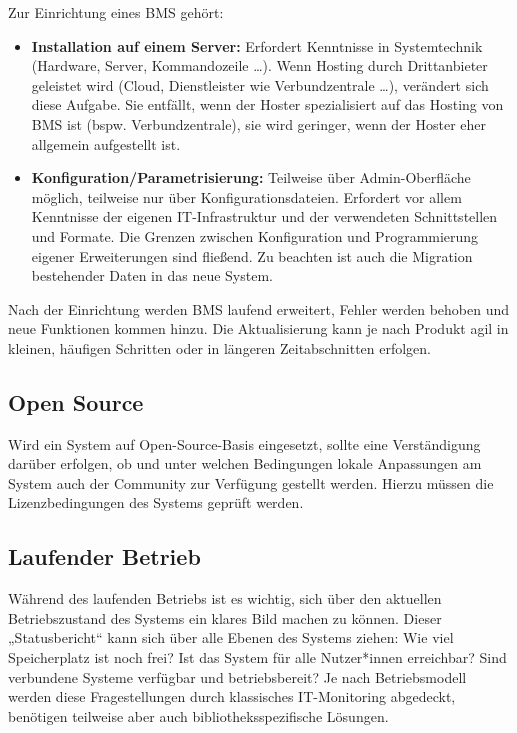 \documentclass[
  11pt,
  letterpaper,
  DIV=11,
  twoside]{scrreprt}
\begin{document}
Zur Einrichtung eines BMS gehört:

\begin{itemize}
\item
  \textbf{Installation auf einem Server:} Erfordert Kenntnisse in
  Systemtechnik (Hardware, Server, Kommandozeile \ldots). Wenn Hosting
  durch Drittanbieter geleistet wird (Cloud, Dienstleister wie
  Verbundzentrale \ldots), verändert sich diese Aufgabe. Sie entfällt,
  wenn der Hoster spezialisiert auf das Hosting von BMS ist (bspw.
  Verbundzentrale), sie wird geringer, wenn der Hoster eher allgemein
  aufgestellt ist.
\item
  \textbf{Konfiguration/Parametrisierung:} Teilweise über
  Admin-Oberfläche möglich, teilweise nur über Konfigurationsdateien.
  Erfordert vor allem Kenntnisse der eigenen IT-Infrastruktur und der
  verwendeten Schnittstellen und Formate. Die Grenzen zwischen
  Konfiguration und Programmierung eigener Erweiterungen sind fließend.
  Zu beachten ist auch die Migration bestehender Daten in das neue
  System.
\end{itemize}

Nach der Einrichtung werden BMS laufend erweitert, Fehler werden behoben
und neue Funktionen kommen hinzu. Die Aktualisierung kann je nach
Produkt agil in kleinen, häufigen Schritten oder in längeren
Zeitabschnitten erfolgen.

\subsection{Open Source}\label{open-source}

Wird ein System auf Open-Source-Basis eingesetzt, sollte eine
Verständigung darüber erfolgen, ob und unter welchen Bedingungen lokale
Anpassungen am System auch der Community zur Verfügung gestellt werden.
Hierzu müssen die Lizenzbedingungen des Systems geprüft werden.

\subsection{Laufender Betrieb}\label{laufender-betrieb}

Während des laufenden Betriebs ist es wichtig, sich über den aktuellen
Betriebszustand des Systems ein klares Bild machen zu können. Dieser
„Statusbericht`` kann sich über alle Ebenen des Systems ziehen: Wie viel
Speicherplatz ist noch frei? Ist das System für alle Nutzer*innen
erreichbar? Sind verbundene Systeme verfügbar und betriebsbereit? Je
nach Betriebsmodell werden diese Fragestellungen durch klassisches
IT-Monitoring abgedeckt, benötigen teilweise aber auch
bibliotheksspezifische Lösungen.
\end{document}
